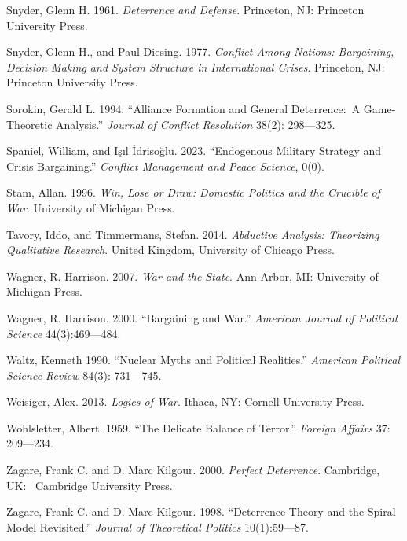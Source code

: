 \documentclass[
]{article}
\begin{document}
Snyder, Glenn H. 1961. \emph{Deterrence and Defense}. Princeton, NJ:
Princeton University Press.

Snyder, Glenn H., and Paul Diesing. 1977. \emph{Conflict Among Nations:
Bargaining, Decision Making and System Structure in International
Crises}. Princeton, NJ: Princeton University Press.

Sorokin, Gerald L. 1994. ``Alliance Formation and General Deterrence:~A
Game-Theoretic Analysis.'' \emph{Journal of Conflict Resolution} 38(2):
298---325.

Spaniel, William, and Işıl İdrisoğlu. 2023. ``Endogenous Military
Strategy and Crisis Bargaining.'' \emph{Conflict Management and Peace
Science}, 0(0).

Stam, Allan. 1996. \emph{Win, Lose or Draw: Domestic Politics and the
Crucible of War}. University of Michigan Press.

Tavory, Iddo, and Timmermans, Stefan. 2014. \emph{Abductive Analysis:
Theorizing Qualitative Research}. United Kingdom, University of Chicago
Press.

Wagner, R. Harrison. 2007. \emph{War and the State}. Ann Arbor, MI:
University of Michigan Press.

Wagner, R. Harrison. 2000. ``Bargaining and War.'' \emph{American
Journal of Political Science} 44(3):469---484.~

Waltz, Kenneth 1990. ``Nuclear Myths and Political Realities.''
\emph{American Political Science Review} 84(3): 731---745.~

Weisiger, Alex. 2013. \emph{Logics of War}. Ithaca, NY: Cornell
University Press.~

Wohlsletter, Albert. 1959. ``The Delicate Balance of Terror.''
\emph{Foreign Affairs} 37: 209---234.

Zagare, Frank C. and D. Marc Kilgour. 2000. \emph{Perfect Deterrence}.
Cambridge, UK:~ Cambridge University Press.

Zagare, Frank C. and D. Marc Kilgour. 1998. ``Deterrence Theory and the
Spiral Model Revisited.'' \emph{Journal of Theoretical Politics}
10(1):59---87.
\end{document}
